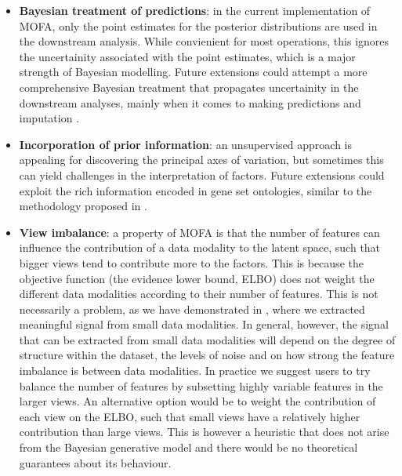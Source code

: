\begin{itemize}

	\item \textbf{Bayesian treatment of predictions}: in the current implementation of MOFA, only the point estimates for the posterior distributions are used in the downstream analysis. While convienient for most operations, this ignores the uncertainity associated with the point estimates, which is a major strength of Bayesian modelling. Future extensions could attempt a more comprehensive Bayesian treatment that propagates uncertainity in the downstream analyses, mainly when it comes to making predictions and imputation \cite{Gelman2013}.

	\item \textbf{Incorporation of prior information}: an unsupervised approach is appealing for discovering the principal axes of variation, but sometimes this can yield challenges in the interpretation of factors. Future extensions could exploit the rich information encoded in gene set ontologies, similar to the methodology proposed in \cite{Buettner2017}.

	\item \textbf{View imbalance}: a property of MOFA is that the number of features can influence the contribution of a data modality to the latent space, such that bigger views tend to contribute more to the factors. This is because the objective function (the evidence lower bound, ELBO) does not weight the different data modalities according to their number of features. This is not necessarily a problem, as we have demonstrated in , where we extracted meaningful signal from small data modalities. In general, however, the signal that can be extracted from small data modalities will depend on the degree of structure within the dataset, the levels of noise and on how strong the feature imbalance is between data modalities. In practice we suggest users to try balance the number of features by subsetting highly variable features in the larger views. An alternative option would be to weight the contribution of each view on the ELBO, such that small views have a relatively higher contribution than large views. This is however a heuristic that does not arise from the Bayesian generative model and there would be no theoretical guarantees about its behaviour.

\end{itemize}

